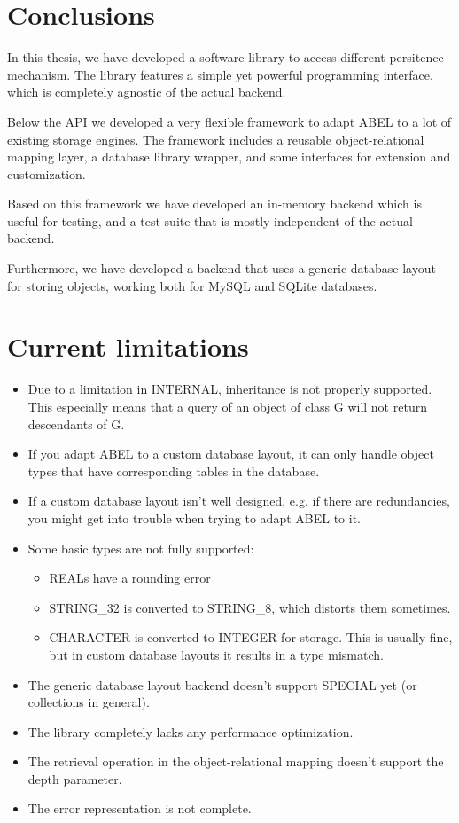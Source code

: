 \section{Conclusions}

In this thesis, we have developed a software library to access different persitence mechanism.
The library features a simple yet powerful programming interface, which is completely agnostic of the actual backend.

Below the API we developed a very flexible framework to adapt ABEL to a lot of existing storage engines.
The framework includes a reusable object-relational mapping layer, a database library wrapper, and some interfaces for extension and customization.

Based on this framework we have developed an in-memory backend which is useful for testing, and a test suite that is mostly independent of the actual backend.

Furthermore, we have developed a backend that uses a generic database layout for storing objects, working both for MySQL and SQLite databases.

\section{Current limitations}

\begin{itemize}
\item Due to a limitation in INTERNAL, inheritance is not properly supported.
This especially means that a query of an object of class G will not return descendants of G.
\item If you adapt ABEL to a custom database layout, it can only handle object types that have corresponding tables in the database.
\item If a custom database layout isn't well designed, e.g. if there are redundancies, you might get into trouble when trying to adapt ABEL to it.
\item Some basic types are not fully supported:
\begin{itemize}
	\item REALs have a rounding error
	\item STRING\_32 is converted to STRING\_8, which distorts them sometimes.
	\item CHARACTER is converted to INTEGER for storage.
	This is usually fine, but in custom database layouts it results in a type mismatch.
\end{itemize}
\item The generic database layout backend doesn't support SPECIAL yet (or collections in general).
\item The library completely lacks any performance optimization.
\item The retrieval operation in the object-relational mapping doesn't support the depth parameter.
\item The error representation is not complete.
\end{itemize}

